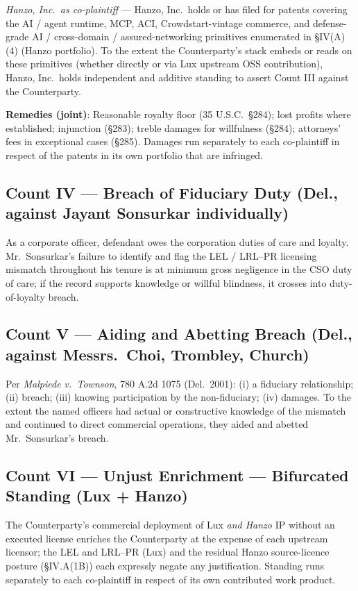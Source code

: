 \documentclass[11pt,letterpaper]{article}
\begin{document}
\textit{Hanzo, Inc.\ as co-plaintiff} --- Hanzo, Inc.\ holds or
has filed for patents covering the AI / agent runtime, MCP, ACI,
Crowdstart-vintage commerce, and defense-grade AI / cross-domain /
assured-networking primitives enumerated in \S IV(A)(4) (Hanzo
portfolio). To the extent the Counterparty's stack embeds or reads
on these primitives (whether directly or via Lux upstream OSS
contribution), Hanzo, Inc.\ holds independent and additive standing
to assert Count III against the Counterparty.

\textbf{Remedies (joint)}: Reasonable royalty floor (35 U.S.C.\
\S 284); lost profits where established; injunction (\S 283); treble
damages for willfulness (\S 284); attorneys' fees in exceptional
cases (\S 285). Damages run separately to each co-plaintiff in
respect of the patents in its own portfolio that are infringed.

\subsection*{Count IV --- Breach of Fiduciary Duty (Del., against Jayant Sonsurkar individually)}

As a corporate officer, defendant owes the corporation duties of
care and loyalty. Mr.\ Sonsurkar's failure to identify and flag the
LEL / LRL--PR licensing mismatch throughout his tenure is at minimum
gross negligence in the CSO duty of care; if the record supports
knowledge or willful blindness, it crosses into duty-of-loyalty
breach.

\subsection*{Count V --- Aiding and Abetting Breach (Del., against Messrs.\ Choi, Trombley, Church)}

Per \emph{Malpiede v.\ Townson}, 780 A.2d 1075 (Del.\ 2001): (i) a
fiduciary relationship; (ii) breach; (iii) knowing participation by
the non-fiduciary; (iv) damages. To the extent the named officers
had actual or constructive knowledge of the mismatch and continued to
direct commercial operations, they aided and abetted Mr.\ Sonsurkar's
breach.

\subsection*{Count VI --- Unjust Enrichment --- Bifurcated Standing (Lux + Hanzo)}

The Counterparty's commercial deployment of Lux \emph{and Hanzo}
IP without an executed license enriches the Counterparty at the
expense of each upstream licensor; the LEL and LRL--PR (Lux) and
the residual Hanzo source-licence posture (\S IV.A(1B)) each
expressly negate any justification. Standing runs separately to
each co-plaintiff in respect of its own contributed work product.
\end{document}
